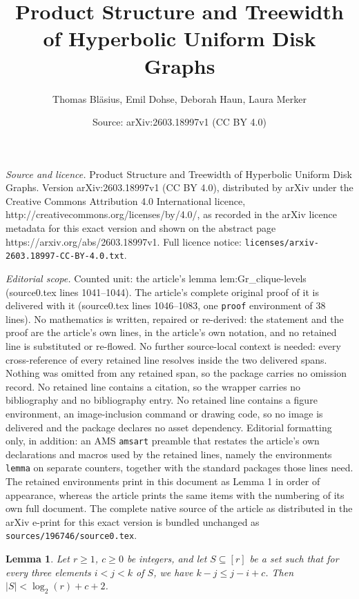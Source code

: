 \documentclass[10pt,a4paper]{amsart}
\title{Product Structure and Treewidth of Hyperbolic Uniform Disk Graphs}
\author{Thomas Bl\"asius, Emil Dohse, Deborah Haun, Laura Merker}
\date{Source: arXiv:2603.18997v1 (CC BY 4.0)}
\newtheorem{lemma}{Lemma}
\begin{document}
\maketitle

\noindent\emph{Source and licence.} Product Structure and Treewidth of Hyperbolic Uniform Disk Graphs. Version arXiv:2603.18997v1 (CC BY 4.0), distributed by arXiv under the Creative Commons Attribution 4.0 International licence, http://creativecommons.org/licenses/by/4.0/, as recorded in the arXiv licence metadata for this exact version and shown on the abstract page https://arxiv.org/abs/2603.18997v1. Full licence notice: \texttt{licenses/arxiv-2603.18997-CC-BY-4.0.txt}.\par\smallskip

\noindent\textit{Editorial scope.} Counted unit: the article's lemma lem:Gr\_clique-levels (source0.tex lines 1041--1044). The article's complete original proof of it is delivered with it (source0.tex lines 1046--1083, one \texttt{proof} environment of 38 lines). No mathematics is written, repaired or re-derived: the statement and the proof are the article's own lines, in the article's own notation, and no retained line is substituted or re-flowed.  No further source-local context is needed: every cross-reference of every retained line resolves inside the two delivered spans.  Nothing was omitted from any retained span, so the package carries no omission record.  No retained line contains a citation, so the wrapper carries no bibliography and no bibliography entry.  No retained line contains a figure environment, an image-inclusion command or drawing code, so no image is delivered and the package declares no asset dependency.  Editorial formatting only, in addition: an AMS \texttt{amsart} preamble that restates the article's own declarations and macros used by the retained lines, namely the environments \texttt{lemma} on separate counters, together with the standard packages those lines need.  The retained environments print in this document as Lemma 1 in order of appearance, whereas the article prints the same items with the numbering of its own full document.  The complete native source of the article as distributed in the arXiv e-print for this exact version is bundled unchanged as \texttt{sources/196746/source0.tex}.
\begin{lemma}\label{lem:Gr_clique-levels}
    Let $ r \geq 1 $, $ c \geq 0 $ be integers, and let $ S \subseteq [r] $ be a set such that for every three elements $ i < j < k $ of $ S $, we have $ k - j \leq j - i + c $.
    Then $ |S| < \log_2(r) + c + 2 $.
\end{lemma}
\end{document}
